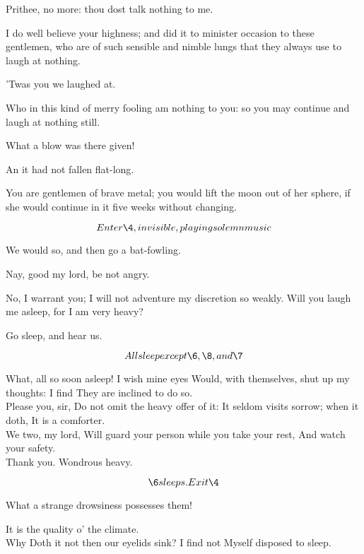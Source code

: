 \documentclass[11pt]{book}
\begin{document}
\begin{PROSE}

\6	Prithee, no more: thou dost talk nothing to me.

\9	I do well believe your highness; and
	did it to minister occasion to these gentlemen,
	who are of such sensible and nimble lungs that
	they always use to laugh at nothing.

\7	'Twas you we laughed at.

\9	Who in this kind of merry fooling am nothing
	to you: so you may continue and laugh at
	nothing still.

\7	What a blow was there given!

\8	An it had not fallen flat-long.

\9	You are gentlemen of brave metal; you would lift
	the moon out of her sphere, if she would continue
	in it five weeks without changing.

	\[Enter \4, invisible, playing solemn music\]

\8	We would so, and then go a bat-fowling.

\7	Nay, good my lord, be not angry.

\9	No, I warrant you; I will not adventure
	my discretion so weakly. Will you laugh
	me asleep, for I am very heavy?

\7	Go sleep, and hear us.

\end{PROSE}
	\[All sleep except \6, \8, and \7\]

\6	What, all so soon asleep! I wish mine eyes
	Would, with themselves, shut up my thoughts: I find
	They are inclined to do so. \\

\8	Please you, sir,
	Do not omit the heavy offer of it:
	It seldom visits sorrow; when it doth,
	It is a comforter. \\

\7	                  We two, my lord,
	Will guard your person while you take your rest,
	And watch your safety. \\

\6	Thank you. Wondrous heavy.

	\[\6 sleeps. Exit \4\]

\8	What a strange drowsiness possesses them!

\7	It is the quality o' the climate. \\

\8	Why
	Doth it not then our eyelids sink? I find not
	Myself disposed to sleep.
\end{document}
